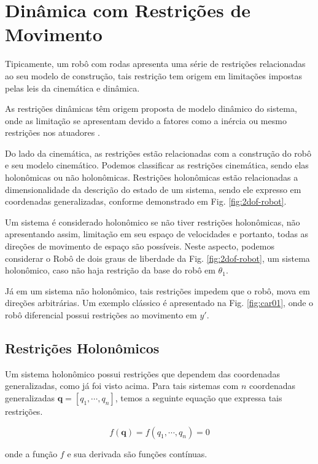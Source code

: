 \section{Dinâmica com Restrições de Movimento}

Tipicamente, um robô com rodas apresenta uma série de restrições relacionadas ao seu modelo de construção, tais restrição tem origem em limitações impostas pelas leis da cinemática e dinâmica.

As restrições dinâmicas têm origem proposta de modelo dinâmico do sistema, onde as limitação se apresentam devido a fatores como a inércia ou mesmo restrições nos atuadores \cite{klancar2017wheeled}.

Do lado da cinemática, as restrições estão relacionadas com a construção do robô e seu modelo cinemático. Podemos classificar as restrições cinemática, sendo elas holonômicas ou não holonômicas. Restrições holonômicas estão relacionadas a dimensionalidade da descrição do estado de um sistema, sendo ele expresso em coordenadas generalizadas, conforme demonstrado em Fig. \ref{fig:2dof-robot}.

Um sistema é considerado holonômico se não tiver restrições holonômicas, não apresentando assim, limitação em seu espaço de velocidades e portanto, todas as direções de movimento de espaço são possíveis. Neste aspecto, podemos considerar o Robô de dois graus de liberdade da Fig. \ref{fig:2dof-robot}, um sistema holonômico, caso não haja restrição da base do robô em $\theta_1$.

Já em um sistema não holonômico, tais restrições impedem que o robô, mova em direções arbitrárias. Um exemplo clássico é apresentado na Fig. \ref{fig:car01}, onde o robô diferencial possui restrições ao movimento em $y'$.




\subsection{Restrições Holonômicos}
 Um sistema holonômico possui restrições que dependem das coordenadas generalizadas, como já foi visto acima. Para tais sistemas com $n$ coordenadas generalizadas $\mathbf{q} = [q_1, \cdots, q_n]$, temos a seguinte equação que expressa tais restrições.

 \begin{equation}
     f(\mathbf{q}) = f(q_1, \cdots, q_n) = 0
     \label{eq:homo}
 \end{equation}

 onde a função $f$ e sua derivada são funções contínuas.

